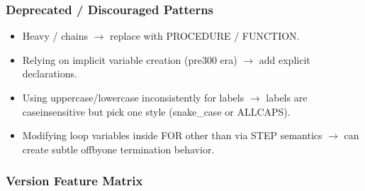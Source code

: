 \documentclass[letterpaper,10pt,english]{sphinxmanual}
\begin{document}
\subsubsection{Deprecated / Discouraged Patterns}
\label{\detokenize{ppl:deprecated-discouraged-patterns}}\begin{itemize}
\item {} 
\sphinxAtStartPar
Heavy  /  chains \(\rightarrow\) replace with PROCEDURE / FUNCTION.

\item {} 
\sphinxAtStartPar
Relying on implicit variable creation (pre\sphinxhyphen{}300 era) \(\rightarrow\) add explicit declarations.

\item {} 
\sphinxAtStartPar
Using uppercase/lowercase inconsistently for labels \(\rightarrow\) labels are case\sphinxhyphen{}insensitive but pick one style (snake\_case or ALLCAPS).

\item {} 
\sphinxAtStartPar
Modifying loop variables inside FOR other than via STEP semantics \(\rightarrow\) can create subtle off\sphinxhyphen{}by\sphinxhyphen{}one termination behavior.

\end{itemize}


\subsubsection{Version Feature Matrix}
\label{\detokenize{ppl:version-feature-matrix}}
\end{document}
